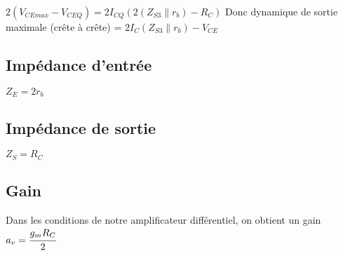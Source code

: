     $2(V_{CEmax}-V_{CEQ}) = 2 I_{CQ} (2(Z_{S3} \parallel r_b) -R_C)$ 
    Donc dynamique de sortie maximale (crête à crête) = $2 I_C (Z_{S3} \parallel r_b) - V_{CE}$

   \subsection{Impédance d'entrée}
    $Z_E = 2 r_b$

   \subsection{Impédance de sortie}
    $Z_S = R_C$

   \subsection{Gain}
    Dans les conditions de notre amplificateur différentiel, on obtient un gain 
    $a_v = \cfrac{g_m R_C}{2}$
